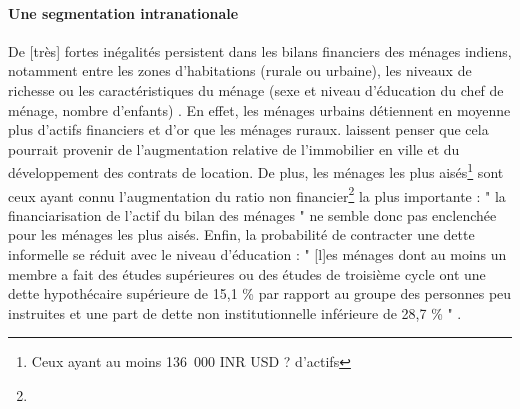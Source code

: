 \documentclass[a4paper, 11pt, onecolumn]{article}
\begin{document}
 \paragraph{Une segmentation intranationale}
 De [très] fortes inégalités persistent dans les bilans financiers des ménages indiens, notamment entre les zones d'habitations (rurale ou urbaine), les niveaux de richesse ou les caractéristiques du ménage (sexe et niveau d'éducation du chef de ménage, nombre d'enfants) \citep{Badarinza2016b}.
 En effet, les ménages urbains détiennent en moyenne plus d'actifs financiers et d'or que les ménages ruraux.
 \cite{Badarinza2016b} laissent penser que cela pourrait provenir de l'augmentation relative de l'immobilier en ville et du développement des contrats de location.
 De plus, les ménages les plus aisés\footnote{Ceux ayant au moins 136~000 INR USD ? d'actifs} sont ceux ayant connu l'augmentation du ratio non financier\footnote{} la plus importante : " la financiarisation de l'actif du bilan des ménages " ne semble donc pas enclenchée pour les ménages les plus aisés.
 Enfin, la probabilité de contracter une dette informelle se réduit avec le niveau d'éducation : " [l]es ménages dont au moins un membre a fait des études supérieures ou des études de troisième cycle ont une dette hypothécaire supérieure de 15,1 \% par rapport au groupe des personnes peu instruites et une part de dette non institutionnelle inférieure de 28,7 \% " \citep{Badarinza2016b}. 
\end{document}
